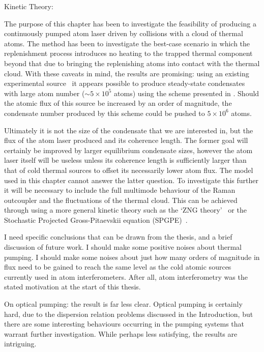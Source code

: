 Kinetic Theory:

The purpose of this chapter has been to investigate the feasibility of producing a continuously pumped atom laser driven by  collisions with a cloud of thermal atoms.  The method has been to investigate the best-case scenario in which the replenishment process introduces no heating to the trapped thermal component beyond that due to bringing the replenishing atoms into contact with the thermal cloud.  With these caveats in mind, the results are promising: using an existing experimental source~\citep{Muller:2007} it appears possible to produce steady-state condensates with large atom number ($\sim 5\times 10^5$ atoms) using the scheme presented in .  Should the atomic flux of this source be increased by an order of magnitude, the condensate number produced by this scheme could be pushed to $5\times 10^6$ atoms.  

Ultimately it is not the size of the condensate that we are interested in, but the flux of the atom laser produced and its coherence length.  The former goal will certainly be improved by larger equilibrium condensate sizes, however the atom laser itself will be useless unless its coherence length is sufficiently larger than that of cold thermal sources to offset its necessarily lower atom flux.  The model used in this chapter cannot answer the latter question.  To investigate this further it will be necessary to include the full multimode behaviour of the Raman outcoupler and the fluctuations of the thermal cloud.  This can be achieved through using a more general kinetic theory such as the `ZNG theory'~\citep{Zaremba:1999,Proukakis:2008} or the Stochastic Projected Gross-Pitaevskii equation (SPGPE)~\citep{Blakie:2008a}.


I need specific conclusions that can be drawn from the thesis, and a brief discussion of future work.  I should make some positive noises about thermal pumping.  I should make some noises about just how many orders of magnitude in flux need to be gained to reach the same level as the cold atomic sources currently used in atom interferometers.  After all, atom interferometry was the stated motivation at the start of this thesis.

On optical pumping: the result is far less clear.  Optical pumping is certainly hard, due to the dispersion relation problems discussed in the Introduction, but there are some interesting behaviours occurring in the pumping systems that warrant further investigation.  While perhaps less satisfying, the results are intriguing.

